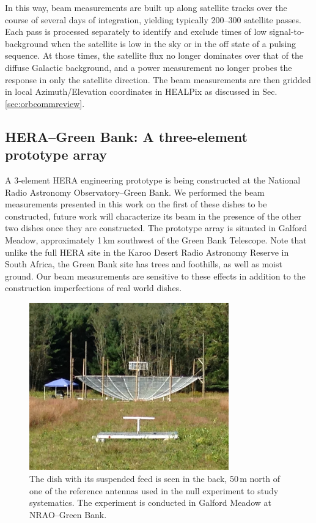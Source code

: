\documentclass{emulateapj}
\begin{document}
In this way, beam measurements are built up along satellite tracks over the course of 
several days of integration, yielding typically 200--300 satellite passes. Each pass is 
processed separately to identify and exclude times of low signal-to-background when the 
satellite is low in the sky or in the off state of a pulsing sequence. At those times, the 
satellite flux no longer dominates over that of the diffuse Galactic background, and a 
power measurement no longer probes the response in only the satellite direction. The beam 
measurements are then gridded in local Azimuth/Elevation coordinates in HEALPix \citep{healpix} as discussed in Sec. \ref{sec:orbcommreview}.


\subsection{HERA--Green Bank: A three-element prototype array}

A 3-element HERA engineering prototype is being constructed at the National Radio 
Astronomy Observatory--Green Bank. We performed the beam measurements presented in 
this work on the first of these dishes to be constructed, future work will characterize its beam in the presence of the other two dishes once they are constructed. The prototype array is situated in Galford Meadow, approximately 1\,km southwest of the Green Bank Telescope. Note that unlike the full HERA site in the Karoo Desert Radio Astronomy Reserve in 
South Africa, the Green Bank site has trees and foothills, as well as moist ground. Our beam measurements
are sensitive to these effects in addition to the construction imperfections of real world dishes.

\begin{figure}[h]
\includegraphics[width=3.4in]{ref_dipole_and_hera_dish.jpg}
\caption{The dish with its suspended feed is seen in the back, 50\,m north of one of the reference antennas used in the null experiment to study systematics. The experiment is conducted in Galford Meadow at NRAO--Green Bank.}
\label{fig:greenbankdishphoto}
\end{figure}
\end{document}
